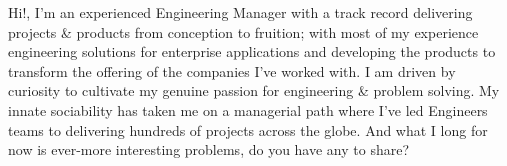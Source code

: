 

\begin{cvparagraph}

Hi!, I'm an experienced Engineering Manager with a track record delivering projects \& products from conception to fruition; with most of my experience engineering solutions for enterprise applications and developing the products to transform the offering of the companies I've worked with. I am driven by curiosity to cultivate my genuine passion for engineering \& problem solving. My innate sociability has taken me on a managerial path where I've led Engineers teams to delivering hundreds of projects across the globe. And what I long for now is ever-more interesting problems, do you have any to share?
\end{cvparagraph}
